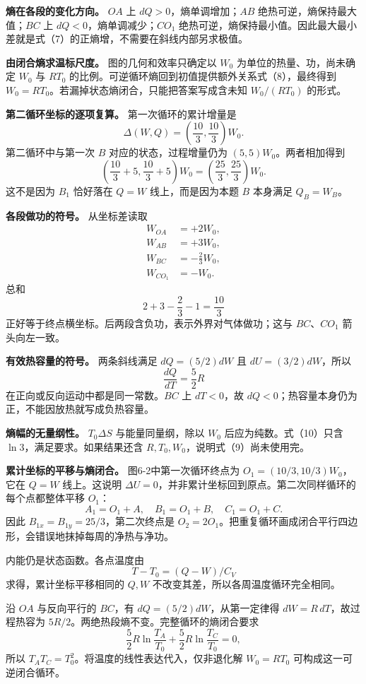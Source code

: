 \documentclass[12pt,a4paper,UTF8]{ctexart}
\begin{document}
\textbf{熵在各段的变化方向。} \(OA\) 上 \(dQ>0\)，熵单调增加；\(AB\)
绝热可逆，熵保持最大值；\(BC\) 上 \(dQ<0\)，熵单调减少；\(CO_1\)
绝热可逆，熵保持最小值。因此最大最小差就是式（7）的正熵增，不需要在斜线内部另求极值。

\textbf{由闭合熵求温标尺度。} 图的几何和效率只确定以 \(W_0\)
为单位的热量、功，尚未确定 \(W_0\) 与 \(RT_0\)
的比例。可逆循环熵回到初值提供额外关系式（8），最终得到
\(W_0=RT_0\)。若漏掉状态熵闭合，只能把答案写成含未知 \(W_0/(RT_0)\)
的形式。

\textbf{第二循环坐标的逐项复算。} 第一次循环的累计增量是 \[
\Delta(W,Q)=\left(\frac{10}{3},\frac{10}{3}\right)W_0.
\] 第二循环中与第一次 \(B\) 对应的状态，过程增量仍为
\((5,5)W_0\)。两者相加得到 \[
\left(\frac{10}{3}+5,\frac{10}{3}+5\right)W_0
=\left(\frac{25}{3},\frac{25}{3}\right)W_0.
\] 这不是因为 \(B_1\) 恰好落在 \(Q=W\) 线上，而是因为本题 \(B\) 本身满足
\(Q_B=W_B\)。

\textbf{各段做功的符号。} 从坐标差读取 \[
\begin{aligned}
W_{OA}&=+2W_0,\\
W_{AB}&=+3W_0,\\
W_{BC}&=-\frac23W_0,\\
W_{CO_1}&=-W_0.
\end{aligned}
\] 总和 \[
2+3-\frac23-1=\frac{10}{3}
\] 正好等于终点横坐标。后两段含负功，表示外界对气体做功；这与
\(BC\)、\(CO_1\) 箭头向左一致。

\textbf{有效热容量的符号。} 两条斜线满足 \(dQ=(5/2)dW\) 且
\(dU=(3/2)dW\)，所以 \[
\frac{dQ}{dT}=\frac52R
\] 在正向或反向运动中都是同一常数。\(BC\) 上 \(dT<0\)，故
\(dQ<0\)；热容量本身仍为正，不能因放热就写成负热容量。

\textbf{熵幅的无量纲性。} \(T_0\Delta S\) 与能量同量纲，除以 \(W_0\)
后应为纯数。式（10）只含 \(\ln3\)，满足要求。如果结果还含
\(R,T_0,W_0\)，说明式（9）尚未使用完。

\textbf{累计坐标的平移与熵闭合。} 图6-2中第一次循环终点为
\(O_1=(10/3,10/3)W_0\)，它在 \(Q=W\) 线上。这说明
\(\Delta U=0\)，并非累计坐标回到原点。第二次同样循环的每个点都整体平移
\(O_1\)： \[
A_1=O_1+A,\quad B_1=O_1+B,\quad C_1=O_1+C.
\] 因此 \(B_{1x}=B_{1y}=25/3\)，第二次终点是
\(O_2=2O_1\)。把重复循环画成闭合平行四边形，会错误地抹掉每周的净热与净功。

内能仍是状态函数。各点温度由 \[
T-T_0=(Q-W)/C_V
\] 求得，累计坐标平移相同的 \(Q,W\)
不改变其差，所以各周温度循环完全相同。

沿 \(OA\) 与反向平行的 \(BC\)，有 \(dQ=(5/2)dW\)，从第一定律得
\(dW=R\,dT\)，故过程热容为
\(5R/2\)。两绝热段熵不变。完整循环的熵闭合要求 \[
\frac52R\ln\frac{T_A}{T_0}+\frac52R\ln\frac{T_C}{T_0}=0,
\] 所以 \(T_AT_C=T_0^2\)。将温度的线性表达代入，仅非退化解 \(W_0=RT_0\)
可构成这一可逆闭合循环。
\end{document}
